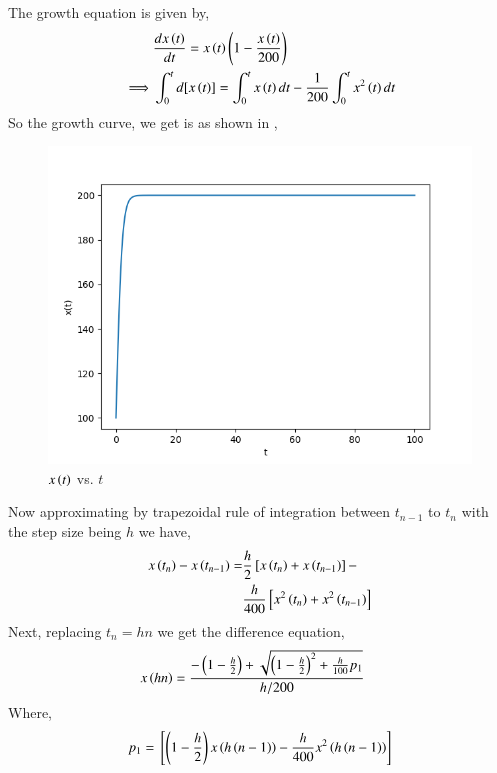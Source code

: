 \documentclass[journal,12pt,twocolumn]{IEEEtran}
\theoremstyle{remark}
\begin{document}
\solution

The growth equation is given by,
\begin{align}
    &\frac{dx\left(t\right)}{dt}=x\left(t\right)\left(1-\frac{x\left(t\right)}{200}\right) \\
    \implies &\int_{0}^{t}d[x\left(t\right)]=\int_{0}^{t}x\left(t\right)dt-\frac{1}{200}\int_{0}^{t}x^2\left(t\right)dt
\end{align}
So the growth curve, we get is as shown in ,
\begin{figure}[h]
    \centering
    \includegraphics[width=\columnwidth]{figs/CT.png}
    \caption{$x\left(t\right)$ vs. $t$}
    \label{fig:i}
\end{figure}
\newline
Now approximating by trapezoidal rule of integration between $t_{n-1}$ to $t_n$ with the step size being $h$ we have,
\begin{align}
    \begin{split}
        x\left(t_n\right)-x\left(t_{n-1}\right)=&\frac{h}{2}{}\left[x\left(t_n\right)+x\left(t_{n-1}\right)\right]- \\
        &\frac{h}{400}{}\left[x^2\left(t_n\right)+x^2\left(t_{n-1}\right)\right]
    \end{split}
\end{align}
Next, replacing $t_{n}=hn$ we get the difference equation,
\begin{align}
    &x\left(hn\right)=\frac{-\left(1-\frac{h}{2}\right)+\sqrt{\left(1-\frac{h}{2}\right)^2+\frac{h}{100}p_1}}{h/200}
\end{align}
Where,
\begin{align}
    p_1={}\left[\left(1-\frac{h}{2}\right)x\left(h\left(n-1\right)\right)-\frac{h}{400}x^2\left(h\left(n-1\right)\right)\right]
\end{align}
\end{document}
